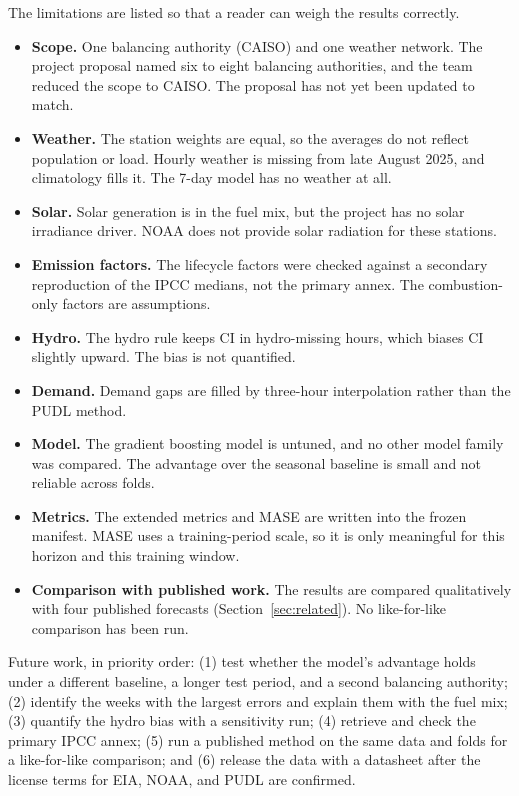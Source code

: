 \documentclass[10pt,journal,compsoc]{IEEEtran}
\begin{document}
The limitations are listed so that a reader can weigh the results correctly.
\begin{itemize}
\item \textbf{Scope.} One balancing authority (CAISO) and one weather network. The project proposal named six to eight balancing authorities, and the team reduced the scope to CAISO. The proposal has not yet been updated to match.
\item \textbf{Weather.} The station weights are equal, so the averages do not reflect population or load. Hourly weather is missing from late August 2025, and climatology fills it. The 7-day model has no weather at all.
\item \textbf{Solar.} Solar generation is in the fuel mix, but the project has no solar irradiance driver. NOAA does not provide solar radiation for these stations.
\item \textbf{Emission factors.} The lifecycle factors were checked against a secondary reproduction of the IPCC medians, not the primary annex. The combustion-only factors are assumptions.
\item \textbf{Hydro.} The hydro rule keeps CI in hydro-missing hours, which biases CI slightly upward. The bias is not quantified.
\item \textbf{Demand.} Demand gaps are filled by three-hour interpolation rather than the PUDL method.
\item \textbf{Model.} The gradient boosting model is untuned, and no other model family was compared. The advantage over the seasonal baseline is small and not reliable across folds.
\item \textbf{Metrics.} The extended metrics and MASE are written into the frozen manifest. MASE uses a training-period scale, so it is only meaningful for this horizon and this training window.
\item \textbf{Comparison with published work.} The results are compared qualitatively with four published forecasts (Section~\ref{sec:related}). No like-for-like comparison has been run.
\end{itemize}

Future work, in priority order: (1) test whether the model's advantage holds under a different baseline, a longer test period, and a second balancing authority; (2) identify the weeks with the largest errors and explain them with the fuel mix; (3) quantify the hydro bias with a sensitivity run; (4) retrieve and check the primary IPCC annex; (5) run a published method on the same data and folds for a like-for-like comparison; and (6) release the data with a datasheet after the license terms for EIA, NOAA, and PUDL are confirmed.
\end{document}
